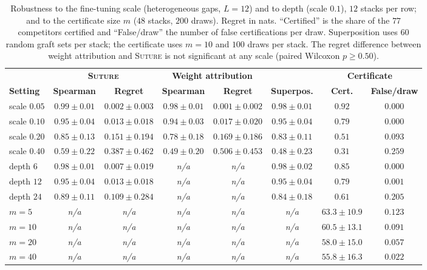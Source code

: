 \documentclass{article}
\theoremstyle{plain}
\theoremstyle{definition}
\theoremstyle{remark}
\DeclareRobustCommand{\na}{\textit{n/a}}
\begin{document}
\begin{table}[H]
\centering
\footnotesize
\setlength{\tabcolsep}{3pt}
\setlength{\tabcolsep}{2.5pt}
\caption{Robustness to the fine-tuning scale (heterogeneous gaps, $L=12$) and to
depth (scale $0.1$), $12$ stacks per row; and to the certificate size
$m$ ($48$ stacks, $200$ draws). Regret in nats. ``Certified'' is the
share of the $77$ competitors certified and ``False/draw'' the number of false
certifications per draw. Superposition uses $60$ random graft
sets per stack; the certificate uses $m=10$ and $100$ draws per stack. The
regret difference between weight attribution and \textsc{Suture} is not
significant at any scale (paired Wilcoxon $p\ge0.50$).}
\label{tab:robustness}
\begin{tabular}{@{}l cc cc c cc@{}}
\toprule
& \multicolumn{2}{c}{\textbf{\textsc{Suture}}} & \multicolumn{2}{c}{\textbf{Weight attribution}} & & \multicolumn{2}{c}{\textbf{Certificate}} \\
\cmidrule(lr){2-3}\cmidrule(lr){4-5}\cmidrule(lr){7-8}
\textbf{Setting} & \textbf{Spearman} & \textbf{Regret} & \textbf{Spearman} & \textbf{Regret} & \textbf{Superpos.} & \textbf{Cert.} & \textbf{False/draw} \\
\midrule
scale $0.05$ & $0.99\pm0.01$ & $0.002\pm0.003$ & $0.98\pm0.01$ & $0.001\pm0.002$ & $0.98\pm0.01$ & $0.92$ & $0.000$ \\
scale $0.10$ & $0.95\pm0.04$ & $0.013\pm0.018$ & $0.94\pm0.03$ & $0.017\pm0.020$ & $0.95\pm0.04$ & $0.79$ & $0.000$ \\
scale $0.20$ & $0.85\pm0.13$ & $0.151\pm0.194$ & $0.78\pm0.18$ & $0.169\pm0.186$ & $0.83\pm0.11$ & $0.51$ & $0.093$ \\
scale $0.40$ & $0.59\pm0.22$ & $0.387\pm0.462$ & $0.49\pm0.20$ & $0.506\pm0.453$ & $0.48\pm0.23$ & $0.31$ & $0.259$ \\
depth $6$ & $0.98\pm0.01$ & $0.007\pm0.019$ & \na & \na & $0.98\pm0.02$ & $0.85$ & $0.000$ \\
depth $12$ & $0.95\pm0.04$ & $0.013\pm0.018$ & \na & \na & $0.95\pm0.04$ & $0.79$ & $0.001$ \\
depth $24$ & $0.89\pm0.11$ & $0.109\pm0.284$ & \na & \na & $0.84\pm0.18$ & $0.61$ & $0.205$ \\
\midrule
$m=5$ & \na & \na & \na & \na & \na & $63.3\pm10.9$ & $0.123$ \\
$m=10$ & \na & \na & \na & \na & \na & $60.5\pm13.1$ & $0.091$ \\
$m=20$ & \na & \na & \na & \na & \na & $58.0\pm15.0$ & $0.057$ \\
$m=40$ & \na & \na & \na & \na & \na & $55.8\pm16.3$ & $0.022$ \\
\bottomrule
\end{tabular}
\end{table}
\end{document}
